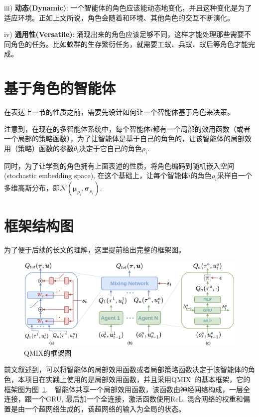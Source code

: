 iii) \textbf{动态(Dynamic)}: 一个智能体的角色应该能动态地变化，并且这种变化是为了适应环境。正如上文所说，角色会随着和环境、其他角色的交互不断演化。

iv) \textbf{通用性(Versatile)}: 涌现出来的角色应该足够不同，这样才能处理那些需要不同角色的任务。比如蚁群的生存繁衍任务，就需要工蚁、兵蚁、蚁后等角色才能完成。


\section{基于角色的智能体}
在表达上一节的性质之前，需要先设计如何让一个智能体基于角色来决策。

注意到，在现在的多智能体系统中，每个智能体$i$都有一个局部的效用函数（或者一个局部的策略函数），为了让智能体是基于自己的角色的，让该智能体的局部效用（策略）函数的参数$\theta_i$决定于它自己的角色$\rho_i$. 

同时，为了让学到的角色拥有上面表述的性质，将角色编码到随机嵌入空间(stochastic embedding space), 在这个基础上，让每个智能体$i$的角色$\rho_i$采样自一个多维高斯分布，即$\mathcal{N}(\bm{\mu}_{\rho_i}, \bm{\sigma}_{\rho_i})$.

\section{框架结构图}
为了便于后续的长文的理解，这里提前给出完整的框架图。

\begin{figure}
    \centering
    \includegraphics[width=0.8\linewidth]{figures/framework/qmix_framework.png}
    \caption{QMIX的框架图}
    \label{fig:qmix_framework}
\end{figure}

前文叙述到，可以将智能体的局部效用函数或者局部策略函数决定于该智能体的角色，本项目在实践上使用的是局部效用函数，并且采用QMIX~\cite{rashid2018qmix}的基本框架，它的框架图为图~\ref{fig:qmix_framework}.　智能体共享一个局部效用函数，该函数由神经网络构成，一层全连接，跟一个GRU, 最后加一个全连接，激活函数使用ReL. 混合网络的权重和偏置是由一个超网络生成的，该超网络的输入为全局的状态。

